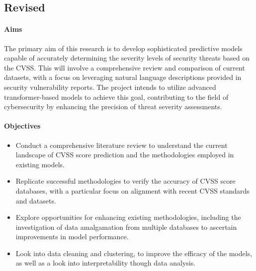 \documentclass[12pt]{article}
\begin{document}
\subsection{Revised}

\paragraph{Aims}

The primary aim of this research is to develop sophisticated predictive models capable of accurately determining
the severity levels of security threats based on the CVSS. This will involve a comprehensive review and comparison
of current datasets, with a focus on leveraging natural language descriptions provided in security vulnerability reports.
The project intends to utilize advanced transformer-based models to achieve this goal, contributing to the field of
cybersecurity by enhancing the precision of threat severity assessments.

\paragraph{Objectives}
\begin{itemize}[noitemsep]

	\item Conduct a comprehensive literature review to understand the current landscape of CVSS
	      score prediction and the methodologies employed in existing models.

	\item Replicate successful methodologies to verify the accuracy of CVSS score databases, with a
	      particular focus on alignment with recent CVSS standards and datasets.

	\item Explore opportunities for enhancing existing methodologies, including the investigation of
	      data amalgamation from multiple databases to ascertain improvements in model performance.

	\item Look into data cleaning and clustering, to improve the efficacy of the models, as well as
	      a look into interpretability though data analysis.

\end{itemize}
\end{document}

